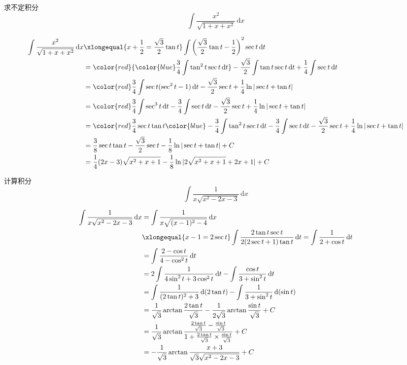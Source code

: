 \documentclass[color=green,titlestyle=hang]{elegantbook}%
\begin{document}
\begin{exercise}求不定积分\begin{equation*}
	\int\frac{x^2}{\sqrt{1+x+x^2}}\,\mathrm{d}x
	\end{equation*}\end{exercise}	
\begin{Solution} 
\begin{align*}
\int\frac{x^2}{\sqrt{1+x+x^2}}\,\mathrm{d}x
&\xlongequal{x+\frac{1}{2}=\frac{\sqrt{3}}{2}\tan t}\int\left(\frac{\sqrt{3}}{2}\tan t-\frac{1}{2}\right)^2\sec t\,\mathrm{d}t\\
&={\color{red}{\color{blue}\frac{3}{4}\int \tan^2t\sec t \,\mathrm{d}t}}-\frac{\sqrt{3}}{2}\int \tan t\sec t\,\mathrm{d}t+\frac{1}{4}\int \sec t\,\mathrm{d}t\\
&={\color{red}\frac{3}{4}\int \sec t(\sec^2t-1) \,\mathrm{d}t}-\frac{\sqrt{3}}{2}\sec t+\frac{1}{4}\ln|\sec t+\tan t|\\
&={\color{red}\frac{3}{4}\int \sec^3t \,\mathrm{d}t-\frac{3}{4}\int \sec t\,\mathrm{d}t}-\frac{\sqrt{3}}{2}\sec t+\frac{1}{4}\ln|\sec t+\tan t|\\
&={\color{red}\frac{3}{4}\sec t\tan t{\color{blue}-\frac{3}{4}\int \tan^2 t\sec t \,\mathrm{d}t}-\frac{3}{4}\int \sec t\,\mathrm{d}t}-\frac{\sqrt{3}}{2}\sec t+\frac{1}{4}\ln|\sec t+\tan t|\\
&=\frac{3}{8}\sec t\tan t-\frac{\sqrt{3}}{2}\sec t-\frac{1}{8}\ln|\sec t+\tan t|+C\\
&=\frac{1}{4}(2x-3)\sqrt{x^2+x+1}-\frac{1}{8}\ln|2\sqrt{x^2+x+1}+2x+1|+C
\end{align*}		
\end{Solution}

\begin{exercise}计算积分\begin{equation*}\int \frac{1}{x\sqrt{x^2-2x-3}}\,\mathrm{d}x\end{equation*}\end{exercise}
\begin{Solution}
\begin{align*}\int \frac{1}{x\sqrt{x^2-2x-3}}\,\mathrm{d}x&=\int \frac{1}{x\sqrt{(x-1)^2-4}}\,\mathrm{d}x\\
&\xlongequal{x-1=2\sec t}\int \frac{2\tan t\sec t}{2(2\sec t+1)\tan t}\,\mathrm{d}t=\int \frac{1}{2+\cos t}\,\mathrm{d}t\\
&=\int \frac{2-\cos t}{4-\cos^2 t}\,\mathrm{d}t\\
&=2\int \frac{1}{4\sin^2t+3\cos^2 t}\,\mathrm{d}t-\int \frac{\cos t}{3+\sin^2 t}\,\mathrm{d}t\\
&=\int \frac{1}{(2\tan t)^2+3}\,\mathrm{d}(2\tan t)-\int \frac{1}{3+\sin^2 t}\,\mathrm{d}(\sin t)\\
&=\frac{1}{\sqrt{3}}\arctan\frac{2\tan t}{\sqrt{3}}-\frac{1}{2\sqrt{3}}\arctan\frac{\sin t}{\sqrt{3}}+C\\
&=\frac{1}{\sqrt{3}}\arctan\frac{\frac{2\tan t}{\sqrt{3}}-\frac{\sin t}{\sqrt{3}}}{1+\frac{2\tan t}{\sqrt{3}}\times\frac{\sin t}{\sqrt{3}}}+C\\
&=-\frac{1}{\sqrt{3}}\arctan\frac{x+3}{\sqrt{3}\sqrt{x^2-2x-3}}+C
\end{align*}		
\end{Solution}
\end{document}
